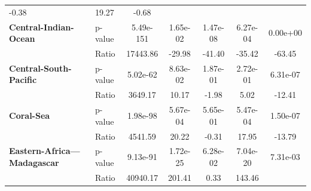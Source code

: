 \begin{table}[H]
{\begin{tabular}{llccccc}
            -0.38
                                                                & 19.27    &
            -0.68
            \\
            \textbf{Central-Indian-Ocean}                       & p-value  &
            5.49e-151                                           & 1.65e-02 &
            1.47e-08                                            & 6.27e-04 &
            0.00e+00
            \\
            \textbf{}                                           & Ratio    &
            17443.86                                            & -29.98   &
            -41.40
                                                                & -35.42   &
            -63.45
            \\
            \textbf{Central-South-Pacific}                      & p-value  &
            5.02e-62                                            & 8.63e-02 &
            1.87e-01                                            & 2.72e-01 &
            6.31e-07
            \\
            \textbf{}                                           & Ratio    &
            3649.17                                             & 10.17    &
            -1.98
                                                                & 5.02     &
            -12.41
            \\
            \textbf{Coral-Sea}                                  & p-value  &
            1.98e-98                                            & 5.67e-04 &
            5.65e-01                                            & 5.47e-04 &
            1.50e-07
            \\
            \textbf{}                                           & Ratio    &
            4541.59                                             & 20.22    &
            -0.31
                                                                & 17.95    &
            -13.79
            \\
            \textbf{Eastern-Africa---Madagascar}                & p-value  &
            9.13e-91                                            & 1.72e-25 &
            6.28e-02                                            & 7.04e-20 &
            7.31e-03
            \\
            \textbf{}                                           & Ratio    &
            40940.17                                            & 201.41   &
            0.33
                                                                & 143.46   &

\end{tabular}}
\end{table}
